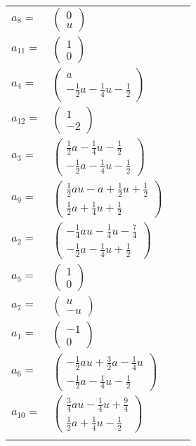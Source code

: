 \documentclass[1p]{elsarticle_modified}
\theoremstyle{definition}
\begin{document}
\begin{tabular}{m{7pt} m{180pt} m{7pt} m{180pt} }
\flushright $a_{8}=$&$\begin{pmatrix}0\\u\end{pmatrix}$ \\
\flushright $a_{11}=$&$\begin{pmatrix}1\\0\end{pmatrix}$ \\
\flushright $a_{4}=$&$\begin{pmatrix}a\\-\frac{1}{2} a-\frac{1}{4} u-\frac{1}{2}\end{pmatrix}$ \\
\flushright $a_{12}=$&$\begin{pmatrix}1\\-2\end{pmatrix}$ \\
\flushright $a_{3}=$&$\begin{pmatrix}\frac{1}{2} a-\frac{1}{4} u-\frac{1}{2}\\-\frac{1}{2} a-\frac{1}{4} u-\frac{1}{2}\end{pmatrix}$ \\
\flushright $a_{9}=$&$\begin{pmatrix}\frac{1}{2} a u- a+\frac{1}{2} u+\frac{1}{2}\\\frac{1}{2} a+\frac{1}{4} u+\frac{1}{2}\end{pmatrix}$ \\
\flushright $a_{2}=$&$\begin{pmatrix}-\frac{1}{4} a u-\frac{1}{4} u-\frac{7}{4}\\-\frac{1}{2} a-\frac{1}{4} u+\frac{1}{2}\end{pmatrix}$ \\
\flushright $a_{5}=$&$\begin{pmatrix}1\\0\end{pmatrix}$ \\
\flushright $a_{7}=$&$\begin{pmatrix}u\\- u\end{pmatrix}$ \\
\flushright $a_{1}=$&$\begin{pmatrix}-1\\0\end{pmatrix}$ \\
\flushright $a_{6}=$&$\begin{pmatrix}-\frac{1}{2} a u+\frac{3}{2} a-\frac{1}{4} u\\-\frac{1}{2} a-\frac{1}{4} u-\frac{1}{2}\end{pmatrix}$ \\
\flushright $a_{10}=$&$\begin{pmatrix}\frac{3}{4} a u-\frac{1}{4} u+\frac{9}{4}\\\frac{1}{2} a+\frac{1}{4} u-\frac{1}{2}\end{pmatrix}$\\&\end{tabular}
\end{document}
